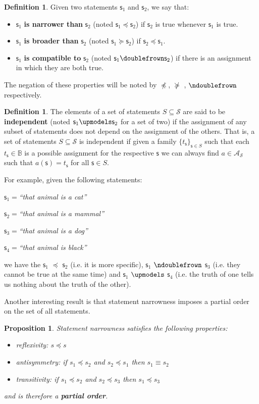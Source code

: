 \documentclass[%
reprint,
amsmath,amssymb,
aps,
prx,
]{revtex4-1}
\theoremstyle{plain}%
\newtheorem{prop}[thrm]{Proposition}
\theoremstyle{definition}
\newtheorem{defn}[thrm]{Definition}
\theoremstyle{remark}
\def\Bool{\mathbb{B}}
\def\comp{\doublefrown}
\def\ncomp{\ndoublefrown}
\def\narrower{\preccurlyeq}
\def\nnarrower{\npreccurlyeq}
\def\broader{\succcurlyeq}
\def\nbroader{\nsucccurlyeq}
\def\indep{\upmodels}
\newcommand{\stmt}[1][s] {\mathsf{#1}}
\def\logCtx{\mathcal{S}}
\newcommand{\pAss}[1][\mathcal{S}] {\mathcal{A}_{#1}}
\newcommand{\statement}[1] {\emph{``#1''}}
\begin{document}
\begin{defn}
	Given two statements $\stmt_1$ and $\stmt_2$, we say that:
	\begin{itemize}
		\item $\stmt_1$ \textbf{is narrower than} $\stmt_2$ (noted $\stmt_1 \narrower \stmt_2$) if $\stmt_2$ is true whenever $\stmt_1$ is true.
		\item $\stmt_1$ \textbf{is broader than} $\stmt_2$ (noted $\stmt_1 \broader \stmt_2$) if $\stmt_2 \narrower \stmt_1$.
		\item $\stmt_1$ \textbf{is compatible to} $\stmt_2$ (noted $\stmt_1 \comp \stmt_2$) if there is an assignment in which they are both true.
		
	\end{itemize}
	The negation of these properties will be noted by $\nnarrower$, $\nbroader$ , $\ncomp$ respectively.
\end{defn}
\begin{defn}
	The elements of a set of statements $S \subseteq \logCtx$ are said to be \textbf{independent} (noted $\stmt_1 \indep \stmt_2$ for a set of two) if the assignment of any subset of statements does not depend on the assignment of the others. That is, a set of statements $S \subseteq \logCtx$ is independent if given a family  $\{t_{\stmt}\}_{\stmt \in S}$ such that each $t_{\stmt} \in \Bool$ is a possible assignment for the respective $\stmt$ we can always find $a \in \pAss$ such that $a(\stmt) = t_{\stmt}$ for all $\stmt \in S$.
\end{defn}

For example, given the following statements:
\begin{description}
	\item $\stmt_1=$\statement{that animal is a cat}
	\item $\stmt_2=$\statement{that animal is a mammal}
	\item $\stmt_3=$\statement{that animal is a dog}
	\item $\stmt_4=$\statement{that animal is black}
\end{description}
we have the $\stmt_1$ $\narrower$ $\stmt_2$ (i.e. it is more specific), $\stmt_1$ $\ncomp$ $\stmt_3$ (i.e. they cannot be true at the same time) and $\stmt_1$ $\indep$ $\stmt_4$ (i.e. the truth of one tells us nothing about the truth of the other).

Another interesting result is that statement narrowness imposes a partial order on the set of all statements.

\begin{prop}
	Statement narrowness satisfies the following properties:
	\begin{itemize}
		\item reflexivity: $s \narrower s$
		\item antisymmetry: if $s_1 \narrower s_2$ and  $s_2 \narrower s_1$ then $s_1 \equiv s_2$
		\item transitivity: if $s_1 \narrower s_2$ and $s_2 \narrower s_3$ then $s_1 \narrower s_3$
	\end{itemize}
	and is therefore a \textbf{partial order}.
\end{prop}
\end{document}
